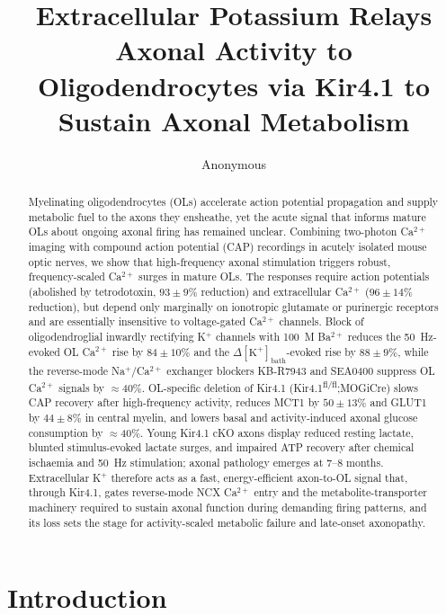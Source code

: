 \documentclass[11pt,a4paper]{article}
\title{Extracellular Potassium Relays Axonal Activity to Oligodendrocytes via Kir4.1 to Sustain Axonal Metabolism}
\author{Anonymous}
\date{}
\begin{document}
\maketitle

\begin{abstract}
\noindent
Myelinating oligodendrocytes (OLs) accelerate action potential propagation and supply metabolic fuel to the axons they ensheathe, yet the acute signal that informs mature OLs about ongoing axonal firing has remained unclear. Combining two-photon Ca$^{2+}$ imaging with compound action potential (CAP) recordings in acutely isolated mouse optic nerves, we show that high-frequency axonal stimulation triggers robust, frequency-scaled Ca$^{2+}$ surges in mature OLs. The responses require action potentials (abolished by tetrodotoxin, $93 \pm 9\%$ reduction) and extracellular Ca$^{2+}$ ($96 \pm 14\%$ reduction), but depend only marginally on ionotropic glutamate or purinergic receptors and are essentially insensitive to voltage-gated Ca$^{2+}$ channels. Block of oligodendroglial inwardly rectifying K$^+$ channels with 100~\textmu M Ba$^{2+}$ reduces the 50~Hz-evoked OL Ca$^{2+}$ rise by $84 \pm 10\%$ and the $\Delta[\text{K}^+]_\text{bath}$-evoked rise by $88 \pm 9\%$, while the reverse-mode Na$^+$/Ca$^{2+}$ exchanger blockers KB-R7943 and SEA0400 suppress OL Ca$^{2+}$ signals by $\approx$40\%. OL-specific deletion of Kir4.1 (Kir4.1\textsuperscript{fl/fl};MOGiCre) slows CAP recovery after high-frequency activity, reduces MCT1 by $50 \pm 13\%$ and GLUT1 by $44 \pm 8\%$ in central myelin, and lowers basal and activity-induced axonal glucose consumption by $\approx$40\%. Young Kir4.1 cKO axons display reduced resting lactate, blunted stimulus-evoked lactate surges, and impaired ATP recovery after chemical ischaemia and 50~Hz stimulation; axonal pathology emerges at 7--8 months. Extracellular K$^+$ therefore acts as a fast, energy-efficient axon-to-OL signal that, through Kir4.1, gates reverse-mode NCX Ca$^{2+}$ entry and the metabolite-transporter machinery required to sustain axonal function during demanding firing patterns, and its loss sets the stage for activity-scaled metabolic failure and late-onset axonopathy.
\end{abstract}

\section{Introduction}
\end{document}
